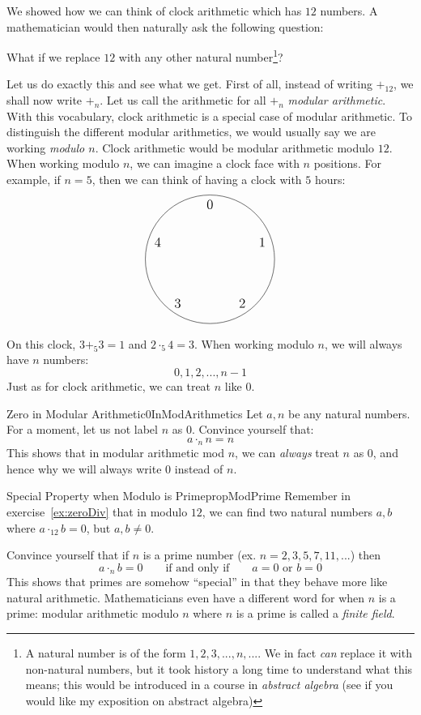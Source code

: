 \documentclass{article}
\begin{document}
We showed how we can think of clock arithmetic which has $12$ numbers.
A mathematician would then naturally ask the following question:
\begin{center}
  What if we replace $12$ with any other natural number\footnote{A natural number is of the form $1,2,3,...,
  n,...$. We in fact \emph{can} replace it with non-natural numbers, but it took history
  a long time to understand what this means; this would be introduced in a course in
  \emph{abstract algebra} (see\cite{NateAlgebra} if you would like my exposition on abstract
      algebra)}?
\end{center}
Let us do exactly this and see what we get. First of all, instead of writing $+_{12}$, we shall now write
$+_{n}$. Let us call the arithmetic for all $+_{n}$ \emph{modular arithmetic}. With this vocabulary,
clock arithmetic is a special case of modular arithmetic. To distinguish the different modular arithmetics, we
would usually say we are working \emph{modulo $n$}. Clock arithmetic would be modular arithmetic modulo
$12$. When working modulo $n$, we can imagine a clock face with $n$ positions. For example, if $n =5$, then we
can think of having a clock with $5$ hours:
\[
  \begin{tikzpicture}
    \draw (0,0) circle (2cm);

    \foreach \x [count=\xi from 0] in {90,18,-54,-126,-198} {
        \node[font=\large] at ({1.7*cos(\x)},{1.7*sin(\x)}) {\xi};
    }
\end{tikzpicture}
\]
On this clock, $3+_{5}3 = 1$ and $2\cdot_{5}4 = 3$. When working modulo $n$, we will always have $n$ numbers:
\[
  0,1,2,..., n-1
\]
Just as for clock arithmetic, we can treat $n$ like $0$.

\begin{exercise}{Zero in Modular Arithmetic}{0InModArithmetics}
  Let $a,n$ be any natural numbers. For a moment, let us not label $n$ as $0$. Convince yourself that:
  \[
    a\cdot_{n}n = n
  \]
  This shows that in modular arithmetic mod $n$, we can \emph{always} treat $n$ as $0$, and hence why we
  will always write $0$ instead of $n$.
\end{exercise}


\begin{exercise}{Special Property when Modulo is Prime}{propModPrime}
  Remember in exercise~\ref{ex:zeroDiv} that in modulo $12$, we can find two natural numbers $a,b$ where
  $a\cdot_{12} b= 0$, but $a,b\ne 0$.

  Convince yourself that if $n$ is a prime number (ex. $n = 2,3,5,7,11,...$) then
  \[
    a\cdot_n b = 0 \qquad \text{if and only if} \qquad a = 0\text{ or } b= 0
  \]
  This shows that primes are somehow ``special'' in that they behave more like natural arithmetic. Mathematicians even have a different word for when $n$
  is a prime: modular arithmetic modulo $n$ where $n$ is a prime is called a \emph{finite field}.
\end{exercise}
\end{document}
